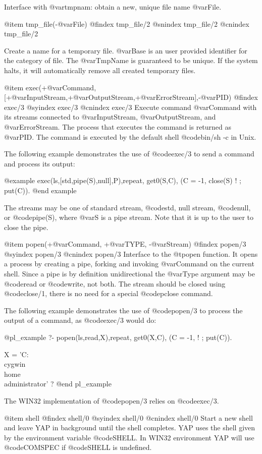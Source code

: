 Interface with @var{tmpnam}: obtain a new, unique file name @var{File}.

@item tmp_file(-@var{File})
@findex  tmp_file/2
@snindex tmp_file/2
@cnindex tmp_file/2

Create a name for a temporary file. @var{Base} is an user provided
identifier for the category of file. The @var{TmpName} is guaranteed to
be unique. If the system halts, it will automatically remove all created
temporary files.


@item exec(+@var{Command},[+@var{InputStream},+@var{OutputStream},+@var{ErrorStream}],-@var{PID})
@findex  exec/3
@syindex exec/3
@cnindex exec/3
Execute command @var{Command} with its streams connected to
@var{InputStream}, @var{OutputStream}, and @var{ErrorStream}. The
process that executes the command is returned as @var{PID}. The
command is executed by the default shell @code{bin/sh -c} in Unix.

The following example demonstrates the use of @code{exec/3} to send a
command and process its output:

@example
exec(ls,[std,pipe(S),null],P),repeat, get0(S,C), (C = -1, close(S) ! ; put(C)).
@end example

The streams may be one of standard stream, @code{std}, null stream,
@code{null}, or @code{pipe(S)}, where @var{S} is a pipe stream. Note
that it is up to the user to close the pipe.

@item popen(+@var{Command}, +@var{TYPE}, -@var{Stream})
@findex  popen/3
@syindex popen/3
@cnindex popen/3
Interface to the @t{popen} function. It opens a process by creating a
pipe, forking and invoking @var{Command} on the current shell. Since a
pipe is by definition unidirectional the @var{Type} argument may be
@code{read} or @code{write}, not both. The stream should be closed
using @code{close/1}, there is no need for a special @code{pclose}
command.

The following example demonstrates the use of @code{popen/3} to process
the output of a command, as @code{exec/3} would do:

@pl_example
   ?- popen(ls,read,X),repeat, get0(X,C), (C = -1, ! ; put(C)).

X = 'C:\\cygwin\\home\\administrator' ?
@end pl_example


The WIN32 implementation of @code{popen/3} relies on @code{exec/3}.

@item shell
@findex  shell/0
@syindex shell/0
@cnindex shell/0
Start a new shell and leave YAP in background until the shell
completes. YAP uses the shell given by the environment variable
@code{SHELL}. In WIN32 environment YAP will use @code{COMSPEC} if
@code{SHELL} is undefined.

